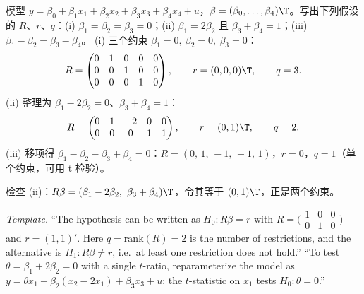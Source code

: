 \begin{prac}[写出 $R$、$r$、$q$]
模型 $y=\beta_0+\beta_1x_1+\beta_2x_2+\beta_3x_3+\beta_4x_4+u$，$\beta=(\beta_0,\dots,\beta_4)\T$。写出下列假设的 $R$、$r$、$q$：(i) $\beta_1=\beta_2=\beta_3=0$；(ii) $\beta_1=2\beta_2$ 且 $\beta_3+\beta_4=1$；(iii) $\beta_1-\beta_2=\beta_3-\beta_4$。
\answer
(i) 三个约束 $\beta_1=0,\ \beta_2=0,\ \beta_3=0$：
\[
R=\begin{pmatrix}0&1&0&0&0\\0&0&1&0&0\\0&0&0&1&0\end{pmatrix},\qquad r=(0,0,0)\T,\qquad q=3 .
\]
(ii) 整理为 $\beta_1-2\beta_2=0$、$\beta_3+\beta_4=1$：
\[
R=\begin{pmatrix}0&1&-2&0&0\\0&0&0&1&1\end{pmatrix},\qquad r=(0,1)\T,\qquad q=2 .
\]
(iii) 移项得 $\beta_1-\beta_2-\beta_3+\beta_4=0$：$R=(0,\,1,\,-1,\,-1,\,1)$，$r=0$，$q=1$（单个约束，可用 t 检验）。

检查 (ii)：$R\beta=(\beta_1-2\beta_2,\ \beta_3+\beta_4)\T$，令其等于 $(0,1)\T$，正是两个约束。
\end{prac}

\begin{english}
\textit{Template.} ``The hypothesis can be written as $H_0:R\beta=r$ with $R=\bigl(\begin{smallmatrix}1&0&0\\0&1&0\end{smallmatrix}\bigr)$ and $r=(1,1)'$. Here $q=\mathrm{rank}(R)=2$ is the number of restrictions, and the alternative is $H_1:R\beta\neq r$, i.e.\ at least one restriction does not hold.'' ``To test $\theta=\beta_1+2\beta_2=0$ with a single $t$-ratio, reparameterize the model as $y=\theta x_1+\beta_2(x_2-2x_1)+\beta_3x_3+u$; the $t$-statistic on $x_1$ tests $H_0:\theta=0$.''
\end{english}
